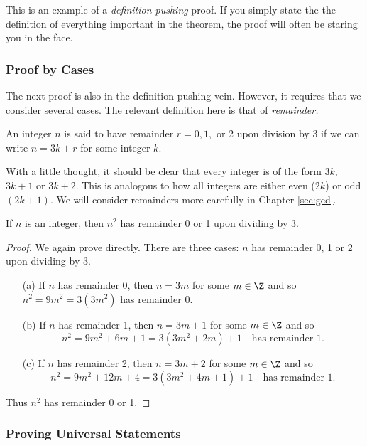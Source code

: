 \noindent This is an example of a \emph{definition-pushing} proof. If you simply state the the definition of everything important in the theorem, the proof will often be staring you in the face.

\subsubsection*{Proof by Cases}

The next proof is also in the definition-pushing vein. However, it requires that we consider several cases. The relevant definition here is that of \emph{remainder.}

\begin{defn}
An integer $n$ is said to have remainder $r=0,1,$ or 2 upon division by 3 if we can write $n=3k+r$ for some integer $k$.
\end{defn}

\noindent With a little thought, it should be clear that every integer is of the form $3k$, $3k+1$ or $3k+2$. This is analogous to how all integers are either even ($2k$) or odd $(2k+1)$. We will consider remainders more carefully in Chapter \ref{sec:gcd}.

\begin{thm}\label{thm:sqmod3}
If $n$ is an integer, then $n^2$ has remainder 0 or 1 upon dividing by 3.
\end{thm}

\begin{proof}
We again prove directly. There are three cases: $n$ has remainder 0, 1 or 2 upon dividing by 3.
\begin{enumerate}
  \item[(a)] If $n$ has remainder 0, then $n=3m$ for some $m\in\Z$ and so $n^2=9m^2=3(3m^2)$ has remainder 0.
  \item[(b)] If $n$ has remainder 1, then $n=3m+1$ for some $m\in\Z$ and so
  \[n^2=9m^2+6m+1=3(3m^2+2m)+1\quad\text{has remainder 1.}\]
  \item[(c)] If $n$ has remainder 2, then $n=3m+2$ for some $m\in\Z$ and so
  \[n^2=9m^2+12m+4=3(3m^2+4m+1)+1\quad\text{has remainder 1.}\]
\end{enumerate}
Thus $n^2$ has remainder 0 or 1.
\end{proof}

\subsubsection*{Proving Universal Statements}

